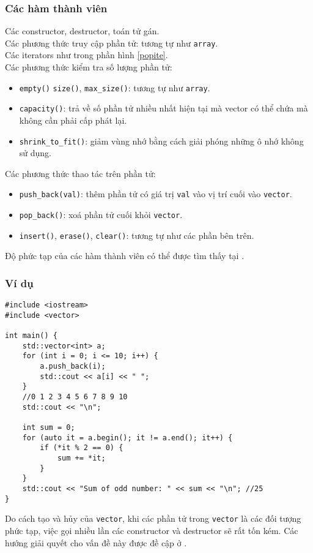 \subsubsection{Các hàm thành viên}
Các constructor, destructor, toán tử gán.\\
Các phương thức truy cập phần tử: tương tự như \lstinline{array}.\\
Các iterators như trong phần hình \ref{popite}.\\
Các phương thức kiểm tra số lượng phần tử:
\begin{itemize}
    \item \lstinline{empty()} \lstinline{size()}, \lstinline{max_size()}: tương tự như \lstinline{array}.
    \item \lstinline{capacity()}: trả về số phần tử nhiều nhất hiện tại mà vector có thể chứa mà không cần phải cấp phát lại.
    \item \lstinline{shrink_to_fit()}:  giảm vùng nhớ bằng cách giải phóng những ô nhớ không sử dụng.
\end{itemize}
Các phương thức thao tác trên phần tử:
\begin{itemize}
    \item  \lstinline{push_back(val)}: thêm phần tử có giá trị \lstinline{val} vào vị trí cuối vào \lstinline{vector}.
    \item \lstinline{pop_back()}: xoá phần tử cuối khỏi \lstinline{vector}.
    \item \lstinline{insert()}, \lstinline{erase()}, \lstinline{clear()}: tương tự như các phần bên trên.
\end{itemize}
Độ phức tạp của các hàm thành viên có thể được tìm thấy tại \cite{vector}.
\subsubsection{Ví dụ}
\begin{lstlisting}
#include <iostream>
#include <vector>

int main() {
    std::vector<int> a;
    for (int i = 0; i <= 10; i++) {
        a.push_back(i);
        std::cout << a[i] << " ";
    }
    //0 1 2 3 4 5 6 7 8 9 10
    std::cout << "\n";
    
    int sum = 0;
    for (auto it = a.begin(); it != a.end(); it++) {
        if (*it % 2 == 0) {
            sum += *it;
        }
    }
    std::cout << "Sum of odd number: " << sum << "\n"; //25
}
\end{lstlisting}
Do cách tạo và hủy của \lstinline{vector}, khi các phần tử trong \lstinline{vector} là các đối tượng phức tạp, việc gọi nhiều lần các constructor và destructor sẽ rất tốn kém. Các hướng giải quyết cho vấn đề này được đề cập ở \cite{tdtfit}.
